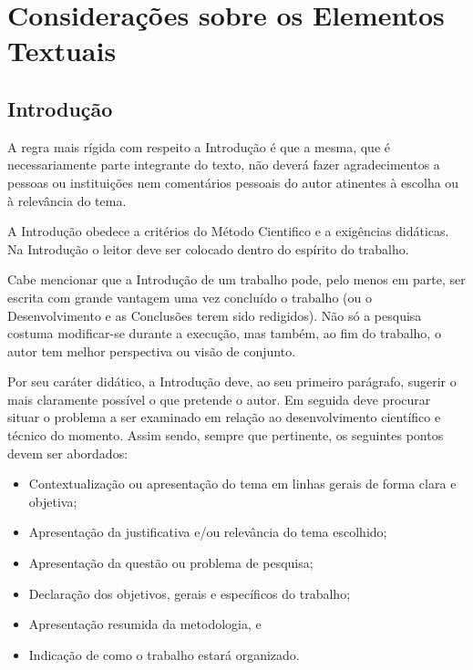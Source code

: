 \chapter[Considerações sobre os Elementos Textuais]{Considerações sobre os 
Elementos Textuais}

\section{Introdução}


A regra mais rígida com respeito a Introdução é que a mesma, que é 
necessariamente parte integrante do texto, não deverá fazer agradecimentos 
a pessoas ou instituições nem comentários pessoais do autor atinentes à 
escolha ou à relevância do tema.

A Introdução obedece a critérios do Método Cientifico e a exigências 
didáticas. Na Introdução o leitor deve ser colocado dentro do espírito do 
trabalho.

Cabe mencionar que a Introdução de um trabalho pode, pelo menos em parte, 
ser escrita com grande vantagem uma vez concluído o trabalho (ou o 
Desenvolvimento e as Conclusões terem sido redigidos). Não só a pesquisa 
costuma modificar-se durante a execução, mas também, ao fim do trabalho, o 
autor tem melhor perspectiva ou visão de conjunto.

Por seu caráter didático, a Introdução deve, ao seu primeiro parágrafo, 
sugerir o mais claramente possível o que pretende o autor. Em seguida deve 
procurar situar o problema a ser examinado em relação ao desenvolvimento 
científico e técnico do momento. Assim sendo, sempre que pertinente, os 
seguintes pontos devem ser abordados: 

\begin{itemize}

	\item Contextualização ou apresentação do tema em linhas gerais de 
	forma clara e objetiva;
	\item Apresentação da justificativa e/ou relevância do tema escolhido;
	\item Apresentação da questão ou problema de pesquisa;
	\item Declaração dos objetivos, gerais e específicos do trabalho;
	\item Apresentação resumida da metodologia, e
	\item Indicação de como o trabalho estará organizado.

\end{itemize}

